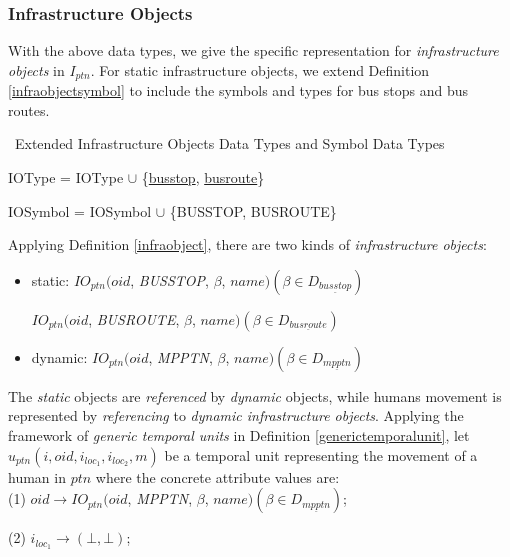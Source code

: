\subsubsection{Infrastructure Objects}
\label{sec:ioinptn}
With the above data types, we give the specific representation for 
\textit{infrastructure objects} in $I_{ptn}$. For static infrastructure objects, we extend Definition \ref{infraobjectsymbol} to include the symbols and types for bus stops and bus routes. \\

\begin{Statement}
\label{infraobjectextend}
\ Extended Infrastructure Objects Data Types and Symbol Data Types 

IOType = IOType $\cup$ \{\underline{busstop}, \underline{busroute}\}

IOSymbol = IOSymbol $\cup$ \{BUSSTOP, BUSROUTE\}

\end{Statement}


Applying Definition \ref{infraobject}, there are two kinds of \textit{infrastructure objects}: 

\begin{itemize}
 \item static: $IO_{ptn}(oid$, \textit{BUSSTOP}, $\beta$, $name)(\beta \in D_{\underline{busstop}})$

 \hspace{0.7cm} $IO_{ptn}(oid$, \textit{BUSROUTE}, $\beta$, $name)(\beta \in D_{\underline{busroute}})$ 

 \item dynamic: $IO_{ptn}(oid$, \textit{MPPTN}, $\beta$, $name)(\beta \in D_{\underline{mpptn}})$

\end{itemize}

The \textit{static} objects are \textit{referenced} by \textit{dynamic} objects, while humans movement is represented by \textit{referencing} to \textit{dynamic infrastructure objects}. 
Applying the framework of \textit{generic temporal units} in Definition \ref{generictemporalunit}, let $u_{ptn}(i,oid,i_{loc_1},i_{loc_2},m)$ be a temporal unit representing the movement of a human in $ptn$ where the concrete attribute values are: \\


(1) $oid\rightarrow IO_{ptn}(oid$, \textit{MPPTN}, $\beta$, $name)(\beta \in D_{\underline{mpptn}})$; 

(2) $i_{loc_1}\rightarrow (\bot,\bot)$; 

